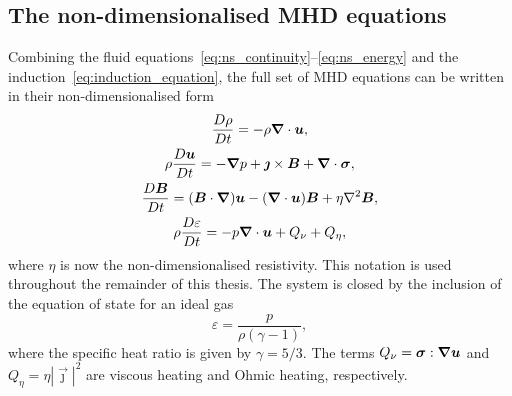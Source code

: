 \subsection{The non-dimensionalised MHD equations}

\label{sec:mhd_equations}

Combining the fluid equations~\eqref{eq:ns_continuity}--\eqref{eq:ns_energy} and the induction~\eqref{eq:induction_equation}, the full set of MHD equations can be written in their non-dimensionalised form
\begin{gather}
\label{eq:mhda}
\frac{D\rho}{Dt} = - \rho \vec{\nabla} \cdot \vec{u},\\
\rho\frac{D\vec{u}}{Dt} = -\vec{\nabla} p + \vec{\jmath} \times \vec{B} + \vec{\nabla} \cdot \ten{\sigma},\\
\frac{D\vec{B}}{Dt} = (\vec{B} \cdot \vec{\nabla})\vec{u} - (\vec{\nabla} \cdot \vec{u})\vec{B} + \eta \nabla^2 \vec{B},\\
\rho\frac{D\varepsilon}{Dt} = -p \vec{\nabla} \cdot \vec{u} + {Q}_{\nu} + {Q}_{\eta},%
\label{eq:energy}
\end{gather}
where $\eta$ is now the non-dimensionalised resistivity. This notation is used throughout the remainder of this thesis. The system is closed by the inclusion of the equation of state for an ideal gas
\begin{equation}
\varepsilon = \frac{p}{\rho(\gamma - 1)},
\end{equation}
where the specific heat ratio is given by $\gamma = 5/3$. The
  terms ${Q}_{\nu} = {\bm \sigma} : {\bm \nabla}{\bm u}$ and
  ${Q}_{\eta} = \eta | \vec{\jmath} |^2$ are viscous heating and Ohmic heating, respectively.

